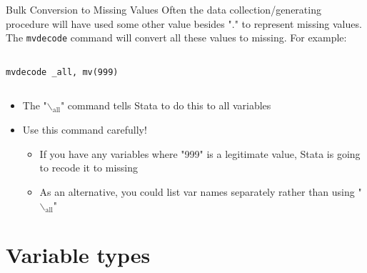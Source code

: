 \documentclass[table,smaller]{beamer}
\begin{document}
\begin{frame}[fragile,label=sec-4-2]{Bulk Conversion to Missing Values}
 Often the data collection/generating procedure will have used some other value besides "." to represent missing values. The \verb~mvdecode~ command will convert all these values to missing. For example:

\vspace{-.5em} \begin{columns}  \begin{block}{}
\begin{verbatim}
mvdecode _all, mv(999)
\end{verbatim}
\end{block} \end{columns}

\begin{itemize}
\item The "$\backslash$$_{\text{all}}$" command tells Stata to do this to all variables
\item Use this command carefully!
\begin{itemize}
\item If you have any variables where "999" is a legitimate value,
Stata is going to recode it to missing
\item As an alternative, you could list var names separately rather
than using "$\backslash$$_{\text{all}}$"
\end{itemize}
\end{itemize}
\end{frame}
\section{Variable types}
\label{sec-5}
\end{document}
